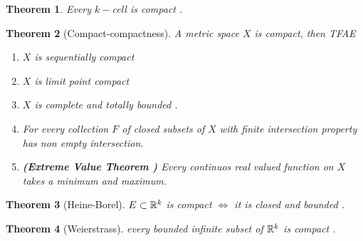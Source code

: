 \documentclass{article}
\newtheorem{theorem}{Theorem}[section]
\begin{document}
\begin{theorem}
	Every $k-$cell is compact .
\end{theorem}
\begin{theorem}[Compact-compactness]
	A metric space $X$ is compact, then TFAE \begin{enumerate}[label = (\alph*)]
			\item  $X$ is sequentially compact \item  $X$ is limit point compact 
		\item  $X$ is complete and totally bounded .
		\item  For every collection $F$ of closed subsets of  $X$ with finite intersection property has non empty intersection.
		\item \textbf{(Extreme Value Theorem )} 
		Every continuos real valued function on $X$
		takes a minimum and maximum.
	
	\end{enumerate}
\end{theorem}
\begin{theorem}[Heine-Borel]
	 $E\subset \mathbb{R}^k$ is compact $\iff$ it is closed and bounded .
	
\end{theorem}
\begin{theorem}[Weierstrass]
	every bounded infinite subset of $\mathbb{R}^k$ is compact .
\end{theorem}
\end{document}
